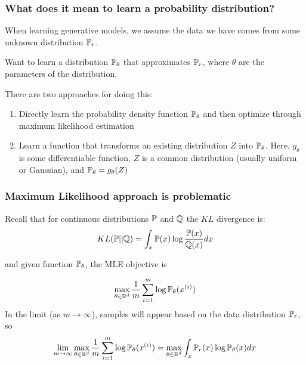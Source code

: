 \documentclass{beamer}
\begin{document}
\begin{frame}
\frametitle{What does it mean to learn a probability distribution?}

\vspace{-20pt}

When learning generative models, we assume the data we have comes from some unknown distribution $\P_{r}$. \\ \vspace{10pt}

Want to learn a distribution $\P_{\theta}$ that approximates $\P_{r}$, where $\theta$ are the parameters of the distribution.

\vspace{10pt}

There are two approaches for doing this:
\pause
\begin{enumerate}
\item{Directly learn the probability density function $\P_{\theta}$ and then optimize through maximum likelihood estimation}
\vspace{5pt}
\pause
\item{Learn a function that transforms an existing distribution $Z$ into $\P_{\theta}$. Here, $g_{\theta}$ is some differentiable function, $Z$ is a common distribution (usually uniform or Gaussian), and $\P_{\theta} = g_{\theta}(Z)$}
\end{enumerate}
\end{frame}

\begin{frame}
\frametitle{Maximum Likelihood approach is problematic}
\vspace{5pt}
Recall that for continuous distributions $\P$ and $\Q$ the $KL$ divergence is:
\vspace{-2.5pt}
$$ KL(\P||\Q) = \int_{x} \P(x) \log\frac{\P(x)}{\Q(x)} dx $$

and given function $\P_{\theta}$, the MLE objective is 

$$ \max_{\theta \in \R^d} \frac{1}{m} \sum_{i=1}^{m} \log \P_{\theta}(x^{(i)}) $$
\vspace{5pt}
In the limit (as $m \to \infty$), samples will appear based on the data distribution $\P_{r}$, so
\vspace{-2.5pt}
\begin{align*}
\lim_{m \to \infty} \max_{\theta \in \R^d} \frac{1}{m} \sum_{i=1}^{m} \log \P_{\theta}(x^{(i)}) &= \max_{\theta \in \R^d} \int_{x} \P_{r}(x) \log \P_{\theta}(x) dx \\
\end{align*}
\end{frame}
\end{document}
